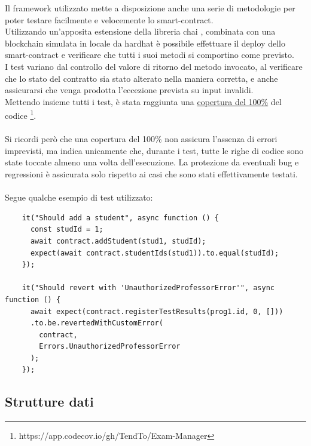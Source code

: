 Il framework utilizzato mette a disposizione anche una serie di metodologie per poter testare facilmente e velocemente lo \gls{smart-contract}. \\
Utilizzando un'apposita estensione della libreria chai \cite{soft:chai}, combinata con una blockchain simulata in locale da hardhat
è possibile effettuare il deploy dello \gls{smart-contract} e verificare che tutti i suoi metodi si comportino come previsto. \\
I test variano dal controllo del valore di ritorno del metodo invocato, al verificare che lo stato del contratto sia stato alterato nella maniera corretta,
e anche assicurarsi che venga prodotta l'eccezione prevista su input invalidi. \\
Mettendo insieme tutti i test, è stata raggiunta una \href{https://app.codecov.io/gh/TendTo/Exam-Manager}{copertura del 100\%} del codice \footnote{https://app.codecov.io/gh/TendTo/Exam-Manager}. \\
\\
Si ricordi però che una copertura del 100\% non assicura l'assenza di errori imprevisti, ma indica unicamente che, durante i test,
tutte le righe di codice sono state toccate almeno una volta dell'esecuzione.
La protezione da eventuali bug e regressioni è assicurata solo rispetto ai casi che sono stati effettivamente testati. \\
\\
Segue qualche esempio di test utilizzato:
\begin{verbatim}
    it("Should add a student", async function () {
      const studId = 1;
      await contract.addStudent(stud1, studId);
      expect(await contract.studentIds(stud1)).to.equal(studId);
    });

    it("Should revert with 'UnauthorizedProfessorError'", async function () {
      await expect(contract.registerTestResults(prog1.id, 0, []))
      .to.be.revertedWithCustomError(
        contract,
        Errors.UnauthorizedProfessorError
      );
    });
\end{verbatim}

\subsection{Strutture dati}

